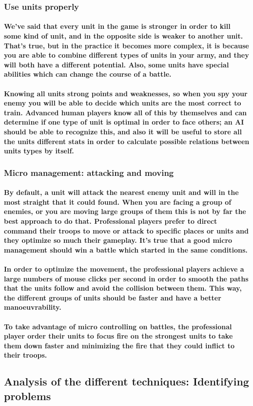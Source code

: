 \documentclass[a4paper,10pt]{article}
\newcommand{\p}[1]{\paragraph{\indent\textnormal{#1}}}
\begin{document}
  \subsubsection{Use units properly}

     \p{We've said that every unit in the game is stronger in order to kill some kind of unit, and in the opposite side is weaker to another unit. That's true, but in the practice it becomes more complex, it is because you are able to combine different types of units in your army, and they will both have a different potential. Also, some units have special abilities which can change the course of a battle.}

     \p{Knowing all units strong points and weaknesses, so when you spy your enemy you will be able to decide which units are the most correct to train. Advanced human players know all of this by themselves and can determine if one type of unit is optimal in order to face others; an AI should be able to recognize this, and also it will be useful to store all the units different stats in order to calculate possible relations between units types by itself.}

  \subsubsection{Micro management: attacking and moving}

    \p{By default, a unit will attack the nearest enemy unit and will in the most straight that it could found. When you are facing a group of enemies, or you are moving large groups of them this is not by far the best approach to do that. Professional players prefer to direct command their troops to move or attack to specific places or units and they optimize so much their gameplay. It's true that a good micro management should win a battle which started in the same conditions.}

    \p{In order to optimize the movement, the professional players achieve a large numbers of mouse clicks per second in order to smooth the paths that the units follow and avoid the collision between them. This way, the different groups of units should be faster and have a better manoeuvrability.}

    \p{To take advantage of micro controlling on battles, the professional player order their units to focus fire on the strongest units to take them down faster and minimizing the fire that they could inflict to their troops.}

\subsection{Analysis of the different techniques: Identifying problems}
\end{document}

